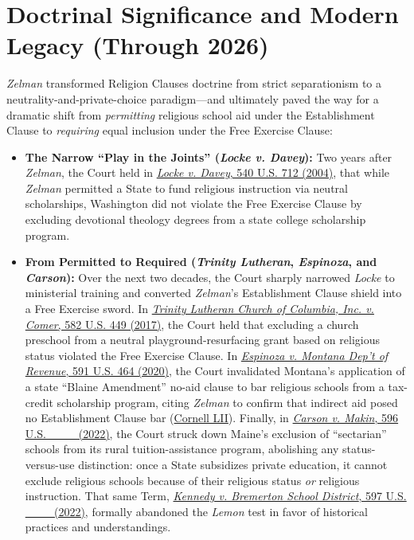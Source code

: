 \documentclass[12pt]{article}
\begin{document}
\section{Doctrinal Significance and Modern Legacy (Through 2026)}

\emph{Zelman} transformed Religion Clauses doctrine from strict separationism to a neutrality-and-private-choice paradigm---and ultimately paved the way for a dramatic shift from \emph{permitting} religious school aid under the Establishment Clause to \emph{requiring} equal inclusion under the Free Exercise Clause:

\begin{itemize}
  \item \textbf{The Narrow ``Play in the Joints'' (\emph{Locke v. Davey}):} Two years after \emph{Zelman}, the Court held in \href{https://supreme.justia.com/cases/federal/us/540/712/}{\emph{Locke v. Davey}, 540 U.S. 712 (2004)}, that while \emph{Zelman} permitted a State to fund religious instruction via neutral scholarships, Washington did not violate the Free Exercise Clause by excluding devotional theology degrees from a state college scholarship program.
  \item \textbf{From Permitted to Required (\emph{Trinity Lutheran}, \emph{Espinoza}, and \emph{Carson}):} Over the next two decades, the Court sharply narrowed \emph{Locke} to ministerial training and converted \emph{Zelman}'s Establishment Clause shield into a Free Exercise sword. In \href{https://supreme.justia.com/cases/federal/us/582/15-577/}{\emph{Trinity Lutheran Church of Columbia, Inc. v. Comer}, 582 U.S. 449 (2017)}, the Court held that excluding a church preschool from a neutral playground-resurfacing grant based on religious status violated the Free Exercise Clause. In \href{https://supreme.justia.com/cases/federal/us/591/18-1195/}{\emph{Espinoza v. Montana Dep't of Revenue}, 591 U.S. 464 (2020)}, the Court invalidated Montana's application of a state ``Blaine Amendment'' no-aid clause to bar religious schools from a tax-credit scholarship program, citing \emph{Zelman} to confirm that indirect aid posed no Establishment Clause bar (\href{https://www.law.cornell.edu/constitution-conan/amendment-1/zelman-and-indirect-aid}{Cornell LII}). Finally, in \href{https://supreme.justia.com/cases/federal/us/596/20-1088/}{\emph{Carson v. Makin}, 596 U.S. \_\_\_ (2022)}, the Court struck down Maine's exclusion of ``sectarian'' schools from its rural tuition-assistance program, abolishing any status-versus-use distinction: once a State subsidizes private education, it cannot exclude religious schools because of their religious status \emph{or} religious instruction. That same Term, \href{https://supreme.justia.com/cases/federal/us/597/21-418/}{\emph{Kennedy v. Bremerton School District}, 597 U.S. \_\_\_ (2022)}, formally abandoned the \emph{Lemon} test in favor of historical practices and understandings.

\end{itemize}
\end{document}

